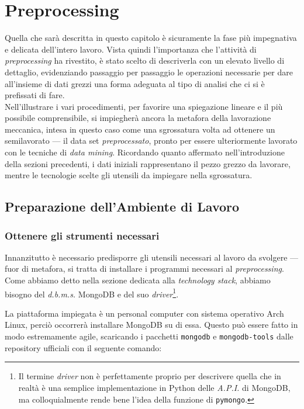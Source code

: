\chapter{Preprocessing}
\label{ch:prepr}

Quella che sarà descritta in questo capitolo è sicuramente la fase più impegnativa e delicata dell'intero lavoro. Vista quindi l'importanza che l'attività di \textit{preprocessing} ha rivestito, è stato scelto di descriverla con un elevato livello di dettaglio, evidenziando passaggio per passaggio le operazioni necessarie per dare all'insieme di dati grezzi una forma adeguata al tipo di analisi che ci si è prefissati di fare. \\

Nell'illustrare i vari procedimenti, per favorire una spiegazione lineare e il più possibile comprensibile, si impiegherà ancora la metafora della lavorazione meccanica, intesa in questo caso come una sgrossatura volta ad ottenere un semilavorato --- il data set \textit{preprocessato}, pronto per essere ulteriormente lavorato con le tecniche di \textit{data mining}. Ricordando quanto affermato nell'introduzione della sezioni precedenti, i dati iniziali rappresentano il pezzo grezzo da lavorare, mentre le tecnologie scelte gli utensili da impiegare nella sgrossatura.

\section{Preparazione dell'Ambiente di Lavoro}

	\subsection{Ottenere gli strumenti necessari}

		Innanzitutto è necessario predisporre gli utensili necessari al lavoro da svolgere --- fuor di metafora, si tratta di installare i programmi necessari al \textit{preprocessing}. Come abbiamo detto nella sezione dedicata alla \textit{technology stack}, abbiamo bisogno del \textit{d.b.m.s.} MongoDB e del suo \textit{driver}\footnote{Il termine \textit{driver} non è perfettamente proprio per descrivere quella che in realtà è una semplice implementazione in Python delle \textit{A.P.I.} di MongoDB, ma colloquialmente rende bene l'idea della funzione di \texttt{pymongo}.}.

		La piattaforma impiegata è un personal computer con sistema operativo Arch Linux, perciò occorrerà installare MongoDB su di essa. Questo può essere fatto in modo estremamente agile, scaricando i pacchetti \texttt{mongodb} e \texttt{mongodb-tools} dalle repository ufficiali con il seguente comando:

